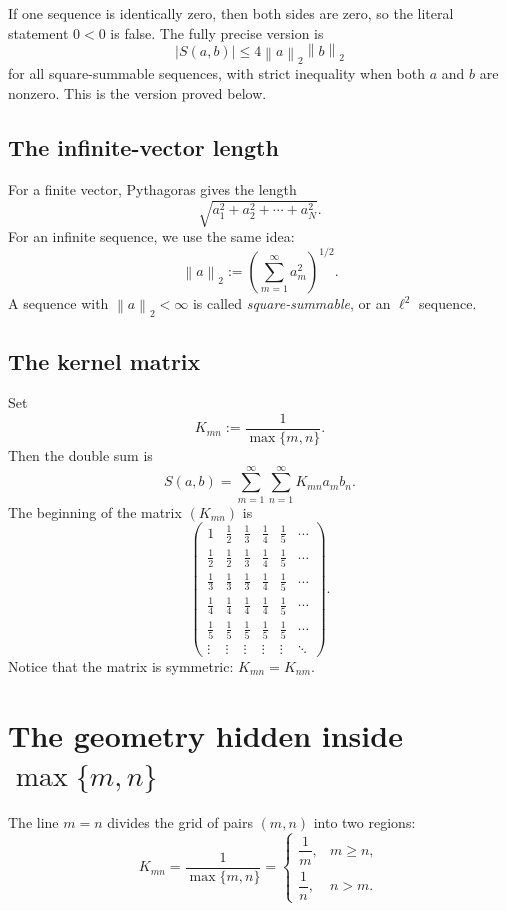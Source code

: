\documentclass[11pt]{article}
\newcommand{\norm}[1]{\left\lVert #1\right\rVert}
\newcommand{\abs}[1]{\left|#1\right|}
\begin{document}
\begin{warningBox}
If one sequence is identically zero, then both sides are zero, so the literal statement \(0<0\) is false. The fully precise version is
\[
 \abs{S(a,b)}\leq 4\norm{a}_2\norm{b}_2
\]
for all square-summable sequences, with strict inequality when both \(a\) and \(b\) are nonzero. This is the version proved below.
\end{warningBox}

\subsection{The infinite-vector length}

For a finite vector, Pythagoras gives the length
\[
  \sqrt{a_1^2+a_2^2+\cdots+a_N^2}.
\]
For an infinite sequence, we use the same idea:
\[
  \norm{a}_2
  :=\left(\sum_{m=1}^{\infty}a_m^2\right)^{1/2}.
\]
A sequence with \(\norm{a}_2<\infty\) is called \emph{square-summable}, or an \(\ell^2\) sequence.

\subsection{The kernel matrix}

Set
\[
  K_{mn}:=\frac{1}{\max\{m,n\}}.
\]
Then the double sum is
\[
  S(a,b)=\sum_{m=1}^{\infty}\sum_{n=1}^{\infty}K_{mn}a_m b_n.
\]
The beginning of the matrix \((K_{mn})\) is
\[
\begin{pmatrix}
1 & \frac12 & \frac13 & \frac14 & \frac15 & \cdots\\[2pt]
\frac12 & \frac12 & \frac13 & \frac14 & \frac15 & \cdots\\[2pt]
\frac13 & \frac13 & \frac13 & \frac14 & \frac15 & \cdots\\[2pt]
\frac14 & \frac14 & \frac14 & \frac14 & \frac15 & \cdots\\[2pt]
\frac15 & \frac15 & \frac15 & \frac15 & \frac15 & \cdots\\[2pt]
\vdots & \vdots & \vdots & \vdots & \vdots & \ddots
\end{pmatrix}.
\]
Notice that the matrix is symmetric: \(K_{mn}=K_{nm}\).

\section{The geometry hidden inside \(\max\{m,n\}\)}

The line \(m=n\) divides the grid of pairs \((m,n)\) into two regions:
\[
  K_{mn}
  =\frac{1}{\max\{m,n\}}
  =\begin{cases}
      \dfrac1m,&m\geq n,\\[5pt]
      \dfrac1n,&n>m.
    \end{cases}
  \tag{2}
\]
\end{document}

